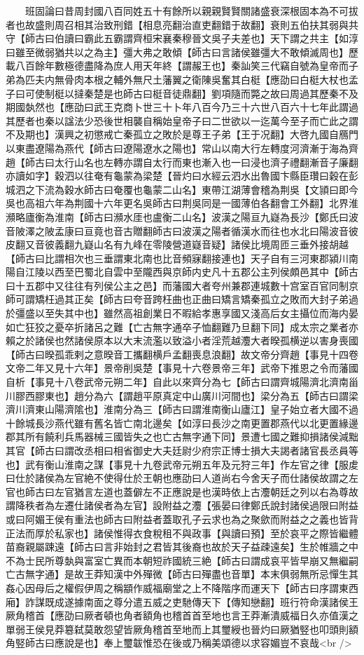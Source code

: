 　　班固論曰昔周封國八百同姓五十有餘所以親親賢賢關諸盛衰深根固本為不可拔者也故盛則周召相其治致刑錯【相息亮翻治直吏翻錯于故翻】衰則五伯扶其弱與共守【師古曰伯讀曰霸此五霸謂齊桓宋襄秦穆晉文吳子夫差也】天下謂之共主【如淳曰雖至微弱猶共以之為主】彊大弗之敢傾【師古曰言諸侯雖彊大不敢傾滅周也】歷載八百餘年數極德盡降為庶人用天年終【謂赧王也】秦訕笑三代竊自號為皇帝而子弟為匹夫内無骨肉本根之輔外無尺土藩翼之衛陳吳奮其白梃【應劭曰白梃大杖也孟子曰可使制梃以撻秦楚是也師古曰梃音徒鼎翻】劉項隨而斃之故曰周過其歷秦不及期國埶然也【應劭曰武王克商卜世三十卜年八百今乃三十六世八百六十七年此謂過其歷者也秦以諡法少恐後世相襲自稱始皇帝子曰二世欲以一迄萬今至子而亡此之謂不及期也】漢興之初懲戒亡秦孤立之敗於是尊王子弟【王于况翻】大啓九國自鴈門以東盡遼陽為燕代【師古曰遼陽遼水之陽也】常山以南大行左轉度河濟漸于海為齊趙【師古曰太行山名也左轉亦謂自太行而東也漸入也一曰浸也濟子禮翻漸音子廉翻亦讀如字】穀泗以往奄有龜蒙為梁楚【晉灼曰水經云泗水出魯國卞縣臣瓚曰穀在彭城泗之下流為穀水師古曰奄覆也龜蒙二山名】東帶江湖薄會稽為荆吳【文頴曰即今吳也高祖六年為荆國十六年更名吳師古曰荆吳同是一國薄伯各翻會工外翻】北界淮瀕略廬衡為淮南【師古曰瀕水厓也盧衡二山名】波漢之陽亘九嶷為長沙【鄭氏曰波音陂澤之陂孟康曰亘竟也音古贈翻師古曰波漢之陽者循漢水而往也水北曰陽波音彼皮翻又音彼義翻九嶷山名有九峰在零陵營道嶷音疑】諸侯比境周匝三垂外接胡越【師古曰比謂相次也三垂謂東北南也比音頻寐翻接連也】天子自有三河東郡潁川南陽自江陵以西至巴蜀北自雲中至隴西與京師内史凡十五郡公主列侯頗邑其中【師古曰十五郡中又往往有列侯公主之邑】而藩國大者夸州兼郡連城數十宫室百官同制京師可謂矯枉過其正矣【師古曰夸音跨枉曲也正曲曰矯言矯秦孤立之敗而大封子弟過於彊盛以至失其中也】雖然高祖創業日不暇給孝惠享國又淺高后女主攝位而海内晏如亡狂狡之憂卒折諸呂之難【亡古無字通卒子恤翻難乃旦翻下同】成太宗之業者亦賴之於諸侯也然諸侯原本以大末流濫以致溢小者淫荒越灋大者暌孤横逆以害身喪國【師古曰暌孤乖剌之意暌音工攜翻横戶孟翻喪息浪翻】故文帝分齊趙【事見十四卷文帝二年又見十六年】景帝削吳楚【事見十六卷景帝三年】武帝下推恩之令而藩國自析【事見十八卷武帝元朔二年】自此以來齊分為七【師古曰謂齊城陽濟北濟南甾川膠西膠東也】趙分為六【謂趙平原真定中山廣川河間也】梁分為五【師古曰謂梁濟川濟東山陽濟隂也】淮南分為三【師古曰謂淮南衡山廬江】皇子始立者大國不過十餘城長沙燕代雖有舊名皆亡南北邊矣【如淳曰長沙之南更置郡燕代以北更置緣邊郡其所有饒利兵馬器械三國皆失之也亡古無字通下同】景遭七國之難抑損諸侯減黜其官【師古曰謂改丞相曰相省御史大夫廷尉少府宗正博士損大夫謁者諸官長丞員等也】武有衡山淮南之謀【事見十九卷武帝元朔五年及元狩三年】作左官之律【服䖍曰仕於諸侯為左官絶不使得仕於王朝也應劭曰人道尚右今舍天子而仕諸侯故謂之左官也師古曰左官猶言左道也蓋僻左不正應說是也漢時依上古灋朝廷之列以右為尊故謂降秩者為左遷仕諸侯者為左官】設附益之灋【張晏曰律鄭氏說封諸侯過限曰附益或曰阿媚王侯有重法也師古曰附益者蓋取孔子云求也為之聚歛而附益之之義也皆背正法而厚於私家也】諸侯惟得衣食稅租不與政事【與讀曰預】至於哀平之際皆繼體苗裔親屬踈遠【師古曰言非始封之君皆其後裔也故於天子益疎遠矣】生於帷牆之中不為士民所尊埶與富室亡異而本朝短祚國統三絶【師古曰謂成哀平皆早崩又無繼嗣亡古無字通】是故王莽知漢中外殫微【師古曰殫盡也音單】本末俱弱無所忌憚生其姦心因母后之權假伊周之稱顓作威福廟堂之上不降階序而運天下【師古曰序謂東西廂】詐謀既成遂據南面之尊分遣五威之吏馳傳天下【傳知戀翻】班行符命漢諸侯王厥角稽首【應劭曰厥者頓也角者額角也稽首首至地也言王莽漸潰威福日久亦值漢之單弱王侯見莽簒弑莫敢怨望皆厥角稽首至地而上其璽綬也晉灼曰厥猶竪也叩頭則額角竪師古曰應說是也】奉上璽韍惟恐在後或乃稱美頌德以求容媚豈不哀哉<br />
